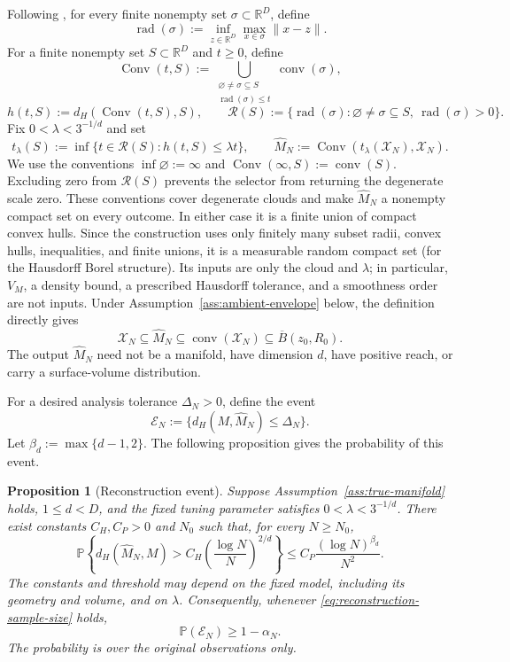 \documentclass{article}
\newtheorem{proposition}{Proposition}
\newcommand{\R}{\mathbb R}
\newcommand{\Pp}{\mathbb P}
\newcommand{\cE}{\mathcal E}
\newcommand{\wideM}{\widehat M_N}
\numberwithin{equation}{section}
\begin{document}
Following \citet[equation~(1.6) and Definitions~4.1 and~4.4]{divol2021},
for every finite nonempty set $\sigma\subset\R^D$, define
\[
 \operatorname{rad}(\sigma)
 :=\inf_{z\in\R^D}\max_{x\in\sigma}\lVert x-z\rVert.
\]
For a finite nonempty set $S\subset\R^D$ and $t\ge0$, define
\[
 \operatorname{Conv}(t,S)
 :=\bigcup_{\substack{\varnothing\ne\sigma\subseteq S\\
                 \operatorname{rad}(\sigma)\le t}}
       \operatorname{conv}(\sigma),
\]
\[
 h(t,S):=d_H(\operatorname{Conv}(t,S),S),
 \qquad
 \mathcal R(S):=
 \{\operatorname{rad}(\sigma):
       \varnothing\ne\sigma\subseteq S,\ 
       \operatorname{rad}(\sigma)>0\}.
\]
Fix $0<\lambda<3^{-1/d}$ and set
\[
 t_\lambda(S)
 :=\inf\{t\in\mathcal R(S):h(t,S)\le\lambda t\},
 \qquad
 \wideM:=\operatorname{Conv}(t_\lambda(\mathcal X_N),\mathcal X_N).
\]
We use the conventions $\inf\varnothing:=\infty$ and
$\operatorname{Conv}(\infty,S):=\operatorname{conv}(S)$. Excluding zero
from $\mathcal R(S)$ prevents the selector from returning the degenerate
scale zero. These conventions cover degenerate clouds and make $\wideM$ a
nonempty compact set on every outcome. In either case it is a finite union
of compact convex hulls. Since the construction uses only
finitely many subset radii, convex hulls, inequalities, and finite unions,
it is a measurable random compact set (for the Hausdorff Borel structure).
Its inputs are only the cloud and $\lambda$; in particular, $V_M$, a density
bound, a prescribed Hausdorff tolerance, and a smoothness order are not
inputs. Under Assumption~\ref{ass:ambient-envelope} below, the definition
directly gives
\[
 \mathcal X_N\subseteq\wideM
 \subseteq\operatorname{conv}(\mathcal X_N)
 \subseteq\overline B(z_0,R_0).
\]
The output $\wideM$ need not be a manifold, have dimension $d$, have
positive reach, or carry a surface-volume distribution.

For a desired analysis tolerance $\Delta_N>0$, define the event
\begin{equation}
 \cE_N:=\{d_H(M,\wideM)\le\Delta_N\}.
\label{eq:reconstruction-event}\tag{Reconstruction}
\end{equation}
Let $\beta_d:=\max\{d-1,2\}$. The following proposition gives the
probability of this event.
\begin{proposition}[Reconstruction event]
\label{prop:reconstruction-event}
Suppose Assumption~\ref{ass:true-manifold} holds, $1\le d<D$, and the
fixed tuning parameter satisfies $0<\lambda<3^{-1/d}$. There exist
constants $C_H,C_P>0$ and $N_0$ such that, for every $N\ge N_0$,
\begin{equation}
 \Pp\left\{
 d_H(\wideM,M)>
 C_H\left(\frac{\log N}{N}\right)^{2/d}
 \right\}
 \le C_P\frac{(\log N)^{\beta_d}}{N^2}.
\label{eq:divol-reconstruction-tail}
\end{equation}
The constants and threshold may depend on the fixed model, including its
geometry and volume, and on $\lambda$. Consequently, whenever
\eqref{eq:reconstruction-sample-size} holds,
\begin{equation}
  \Pp(\cE_N)\ge1-\alpha_N.
\label{eq:event-probability}
\end{equation}
The probability is over the original observations only.
\end{proposition}
\end{document}
